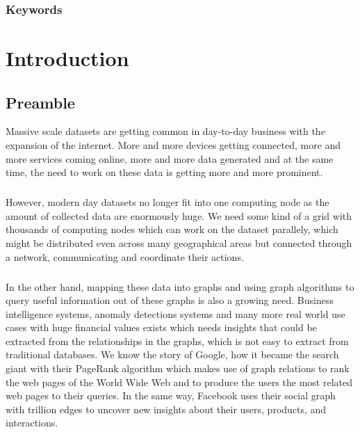 \documentclass[12pt]{report}
\numberwithin{figure}{section}
\numberwithin{table}{section}
\begin{document}
\subsection*{Keywords}

\newpage

\listoffigures

\tableofcontents

\newpage
{}



\chapter{Introduction}

\section{Preamble}

Massive scale datasets are getting common in day-to-day business with the expansion of the internet. More and more devices getting connected, more and more services coming online, more and more data generated and at the same time, the need to work on these data is getting more and more prominent.

\paragraph{}

However, modern day datasets no longer fit into one computing node as the amount of collected data are enormously huge.  We need some kind of a grid with thousands of computing nodes which can work on the dataset parallely, which might be distributed even across many geographical areas but connected through a network, communicating and coordinate their actions.

\paragraph{}

In the other hand, mapping these data into graphs and using graph algorithms to query useful information out of these graphs is also a growing need. Business intelligence systems, anomaly detections systems and many more real world use cases with huge financial values exists which needs insights that could be extracted from the relationships in the graphs, which is not easy to extract from traditional databases. We know the story of Google, how it became the search giant with their PageRank\cite{PageRank} algorithm which makes use of graph relations to rank the web pages of the World Wide Web and to produce the users the most related web pages to their queries. In the same way, Facebook uses their social graph with trillion edges\cite{Facebook} to uncover new insights about their users, products, and interactions.
\end{document}

